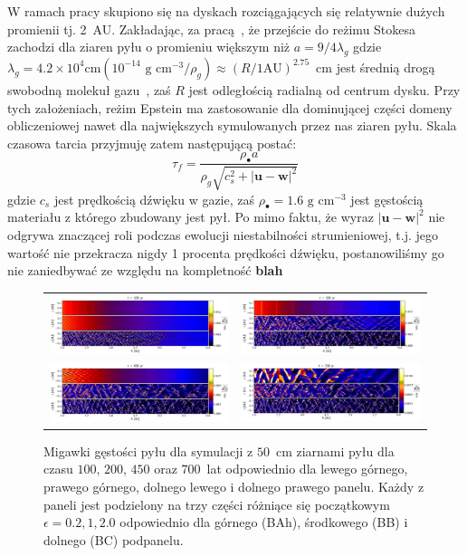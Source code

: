 W ramach pracy skupiono się na dyskach rozciągających się relatywnie dużych
promienii tj. 2~AU. Zakładając, za pracą~\cite{CD93}, że przejście do
reżimu Stokesa zachodzi dla ziaren pyłu o promieniu większym niż
$a = 9/4\lambda_g$ gdzie $\lambda_g = 4.2\times 10^4\textrm{
cm} (10^{-14}\textrm{ g cm}^{-3}/\rho_g) \approx (R/1 \textrm{AU})^{2.75}$~cm 
jest średnią drogą swobodną molekuł gazu~\citep{W77,BT09}, zaś $R$ jest
odległością radialną od centrum dysku. Przy tych założeniach, reżim Epstein ma
zastosowanie dla dominującej części domeny obliczeniowej nawet dla największych
symulowanych przez nas ziaren pyłu. Skala czasowa tarcia przyjmuję zatem
następującą postać:
%
\begin{equation}
   \tau_f = \frac{\rho_\bullet a} 
      {\rho_g \sqrt{c_s^2 + |\mathbf{u} - \mathbf{w}|^2 }}
   \label{eq:tauf} 
\end{equation}
%
gdzie $c_s$ jest prędkością dźwięku w gazie, zaś $\rho_\bullet = 1.6\textrm{ g cm}^{-3}$
jest gęstością materiału z którego zbudowany jest pył. Po mimo faktu, że wyraz
$|\mathbf{u}-\mathbf{w}|^2$ nie odgrywa znaczącej roli podczas ewolucji
niestabilności strumieniowej, t.j. jego wartość nie przekracza nigdy 1 procenta
prędkości dźwięku, postanowiliśmy go nie zaniedbywać ze względu na
kompletność {\bf blah}
%
\begin{figure}
   \centering
   \begin{tabular}{@{}cc@{}}
      \includegraphics[width=0.49\linewidth]{figures/fig1a} & 
      \includegraphics[width=0.49\linewidth]{figures/fig1b} \\
      \includegraphics[width=0.49\linewidth]{figures/fig1c} &
      \includegraphics[width=0.49\linewidth]{figures/fig1d}
   \end{tabular}
   \caption{Migawki gęstości pyłu dla symulacji z $50$~cm ziarnami pyłu
      dla czasu $100$, $200$, $450$ oraz $700$~lat odpowiednio dla lewego
      górnego, prawego górnego, dolnego lewego i dolnego prawego panelu.
      Każdy z paneli jest podzielony na trzy części różniące się początkowym 
      $\epsilon = 0.2, 1, 2.0$ odpowiednio dla górnego (BAh), środkowego (BB) i
      dolnego (BC) podpanelu.}
   \label{fig1}
\end{figure}
%
